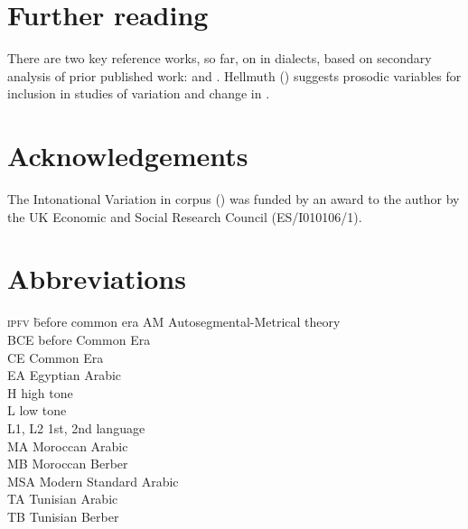 \documentclass[output=paper]{langsci/langscibook}
\begin{document}
\section*{Further reading}

There are two key reference works, so far, on  in  dialects, based on secondary analysis of prior published work: \citet{Chahal2011} and \citet{ElZarka2017}. Hellmuth (\citeyear{Hellmuth2019}) suggests prosodic variables for inclusion in studies of variation and change in . 

\section*{Acknowledgements}

The Intonational Variation in  corpus (\citealt{HellmuthAlmbark2017}) was funded by an award to the author by the UK Economic and Social Research Council (ES/I010106/1).

\section*{Abbreviations}
\setlength{\columnsep}{30pt}
\begin{multicols}{2}
\begin{tabbing}
\textsc{ipfv} \hspace{1em} \= before common era\kill
AM \> Autosegmental-Metrical theory \hspace{10mm} \\
BCE \> before Common Era \\
CE \> Common Era \\
EA \> Egyptian Arabic \\
H \> high {tone} \\
L \> low {tone} \\
L1, L2 \> 1st, 2nd language \\
MA \> Moroccan Arabic \\
MB \> {Moroccan Berber} \\
MSA \> Modern Standard {Arabic} \\
{TA} \> {Tunisian Arabic} \\
{TB} \> {Tunisian Berber} 
\end{tabbing}
\end{multicols}

\sloppy
\printbibliography[heading=subbibliography,notkeyword=this]
\end{document}
